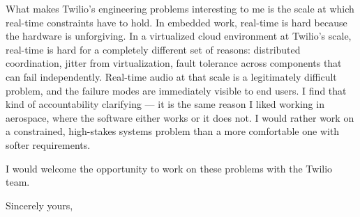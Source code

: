 \documentclass{letter}
\begin{document}
\begin{letter}{}
  \noindent What makes Twilio's engineering problems interesting to me is
  the scale at which real-time constraints have to hold. In embedded work,
  real-time is hard because the hardware is unforgiving. In a virtualized
  cloud environment at Twilio's scale, real-time is hard for a completely
  different set of reasons: distributed coordination, jitter from
  virtualization, fault tolerance across components that can fail
  independently. Real-time audio at that scale is a legitimately difficult
  problem, and the failure modes are immediately visible to end users. I
  find that kind of accountability clarifying --- it is the same reason I
  liked working in aerospace, where the software either works or it does not.
  I would rather work on a constrained, high-stakes systems problem than a
  more comfortable one with softer requirements.

  \noindent I would welcome the opportunity to work on these problems with
  the Twilio team.

  \closing{Sincerely yours,}

\end{letter}
\end{document}
